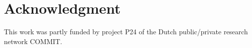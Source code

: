 

\section*{Acknowledgment}
This work was partly funded by project P24 of the Dutch public/private research network COMMIT.


